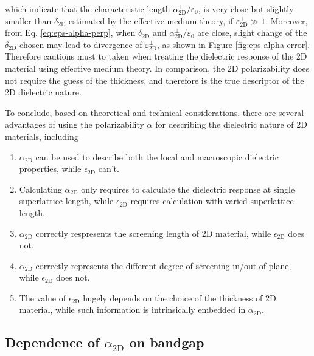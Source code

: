 \documentclass[manuscript=suppinfo,email=true,hyperref=true,keywords=false]{achemso}
\begin{document}
which indicate that the characteristic length
$\alpha_{\mathrm{2D}}^{\perp}/\varepsilon_{0}$, is very close but slightly smaller
than $\delta_{\mathrm{2D}}$ estimated by the effective medium theory,
if $\varepsilon^{\perp}_{\mathrm{2D}} \gg 1$. Moreover, from
Eq. \ref{eq:eps-alpha-perp}, when $\delta_{\mathrm{2D}}$ and
$\alpha_{\mathrm{2D}}^{\perp}/\varepsilon_{0}$ are close, slight change of the
$\delta_{\mathrm{2D}}$ chosen may lead to divergence of
$\varepsilon_{\mathrm{2D}}^{\perp}$, as shown in Figure
\ref{fig:eps-alpha-error}. Therefore cautions must to taken when
treating the dielectric response of the 2D material using effective
medium theory. In comparison, the 2D polarizability does not require
the guess of the thickness, and therefore is the true descriptor of
the 2D dielectric nature.

To conclude, based on theoretical and technical considerations, there are several
advantages of using the polarizability $\alpha$ for describing the dielectric
nature of 2D materials, including
\begin{enumerate}
\item $\alpha_{\mathrm{2D}}$ can be used to describe both the local and macroscopic dielectric properties, while $\epsilon_{\mathrm{2D}}$ can't.
\item Calculating $\alpha_{\mathrm{2D}}$ only requires to calculate the dielectric response at single superlattice length, while $\epsilon_{\mathrm{2D}}$ requires calculation with varied superlattice length.
\item $\alpha_{\mathrm{2D}}$ correctly respresents the screening length of 2D material, while $\epsilon_{\mathrm{2D}}$ does not.
\item $\alpha_{\mathrm{2D}}$ correctly represents the different degree of screening in/out-of-plane, while $\epsilon_{\mathrm{2D}}$ does not.
  
\item The value of $\epsilon_{\mathrm{2D}}$ hugely depends on the
  choice of the thickness of 2D material, while such information is
  intrinsically embedded in $\alpha_{\mathrm{2D}}$.
\end{enumerate}


\subsection{Dependence of $\alpha_{\mathrm{2D}}$ on bandgap}
\label{sec:pol-2D-Eg}
\end{document}
